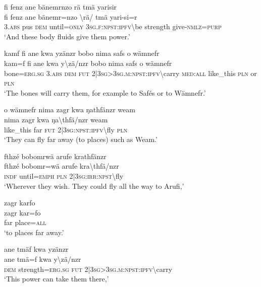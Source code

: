 \ea\label{ex:a4389}
fi fenz ane bänemrnzo rä tmä yarisir\\
\gll fi	fenz	ane	bänemr=nzo	{\textbackslash}rä/	tmä	yari-si=r\\
     3.\textsc{abs}	pus	\textsc{dem}	until=\textsc{only}	3\textsc{sg}.\textsc{f}:\textsc{npst}:\textsc{ipfv}{\textbackslash}be	strength	give-\textsc{nmlz}=\textsc{purp}\\
\glt `And these body fluids give them power.'
\z

\ea\label{ex:a4391}
kamf fi ane kwa yzänzr bobo nima safs o wämnefr\\
\gll kam=f	fi	ane	kwa	y{\textbackslash}zä/nzr	bobo	nima	safs	o	wämnefr\\
     bone=\textsc{erg}.\textsc{sg}	3.\textsc{abs}	\textsc{dem}	\textsc{fut}	2|3\textsc{sg}>3\textsc{sg}.\textsc{m}:\textsc{npst}:\textsc{ipfv}{\textbackslash}carry	\textsc{med}:\textsc{all}	like\_this	\textsc{pln}	or	\textsc{pln}\\
\glt `The bones will carry them, for example to Safés or to Wämnefr.'
\z

\ea\label{ex:a4392}
o wämnefr nima zagr kwa ŋathfänzr weam\\
\gll nima	zagr	kwa	ŋa{\textbackslash}thfä/nzr	weam\\
     like\_this	far	\textsc{fut}	2|3\textsc{sg}:\textsc{npst}:\textsc{ipfv}{\textbackslash}fly	\textsc{pln}\\
\glt `They can fly far away (to places) such as Weam.'
\z

\ea\label{ex:a4394}
fthzé bobomrwä arufe krathfänzr\\
\gll fthzé	bobomr=wä	arufe	kra{\textbackslash}thfä/nzr\\
     \textsc{indf}	until=\textsc{emph}	\textsc{pln}	2|3\textsc{sg}:\textsc{irr}:\textsc{npst}{\textbackslash}fly\\
\glt `Wherever they wish. They could fly all the way to Arufi,'
\z

\ea\label{ex:a4395}
zagr karfo\\
\gll zagr	kar=fo\\
     far	place=\textsc{all}\\
\glt `to places far away.'
\z

\ea\label{ex:a4396}
ane tmäf kwa yzänzr\\
\gll ane	tmä=f	kwa	y{\textbackslash}zä/nzr\\
     \textsc{dem}	strength=\textsc{erg}.\textsc{sg}	\textsc{fut}	2|3\textsc{sg}>3\textsc{sg}.\textsc{m}:\textsc{npst}:\textsc{ipfv}{\textbackslash}carry\\
\glt `This power can take them there,'
\z

